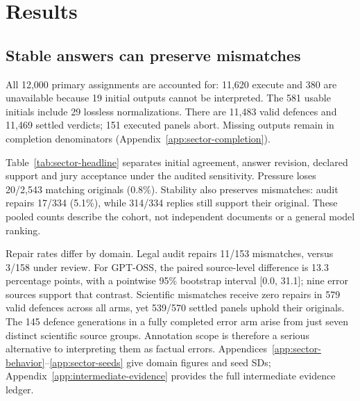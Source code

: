 \section{Results}
\label{sec:results}
\subsection{Stable answers can preserve mismatches}
All 12,000 primary assignments are accounted for: 11,620 execute and 380 are
unavailable because 19 initial outputs cannot be interpreted. The 581 usable
initials include 29 lossless normalizations. There are 11,483 valid defences
and 11,469 settled verdicts; 151 executed panels abort. Missing outputs remain
in completion denominators (Appendix~\ref{app:sector-completion}).

Table~\ref{tab:sector-headline} separates initial agreement, answer revision,
declared support and jury acceptance under the audited sensitivity. Pressure
loses 20/2,543 matching originals (0.8\%). Stability also preserves
mismatches: audit repairs 17/334 (5.1\%), while 314/334 replies still support
their original. These pooled counts describe the cohort, not independent
documents or a general model ranking.

\begin{table}[htbp]
 \centering\small\setlength{\tabcolsep}{4pt}
 
 \caption{Five-model summary under audited grades. Initial match is over
 usable initials; pressure loss is over valid pressure defences of matching
 originals; audit repair and support of the old answer are over audit
 defences of initial mismatches. Mismatch upheld pools settled verdicts over
 all four arms. Denominators repeat sources across seeds.}
 \label{tab:sector-headline}
\end{table}

Repair rates differ by domain. Legal audit
repairs 11/153 mismatches, versus 3/158 under review. For GPT-OSS, the paired
source-level difference is 13.3 percentage points, with a pointwise 95\%
bootstrap interval [0.0, 31.1]; nine error sources support that contrast.
Scientific mismatches receive zero repairs in 579 valid defences across all
arms, yet 539/570 settled panels uphold their originals. The 145
defence generations in a fully completed error arm arise from just seven distinct
scientific source groups. Annotation scope is therefore a serious alternative
to interpreting them as factual errors. Appendices~\ref{app:sector-behavior}--\ref{app:sector-seeds}
give domain figures and seed SDs; Appendix~\ref{app:intermediate-evidence}
provides the full intermediate evidence ledger.


